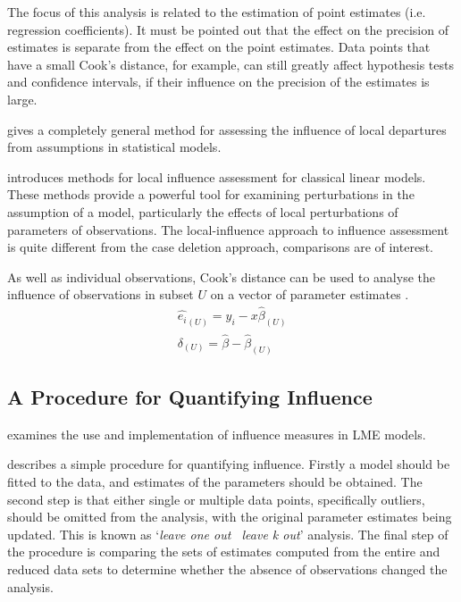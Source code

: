 \documentclass[12pt, a4paper]{report}
\theoremstyle{plain}
\theoremstyle{definition}
\theoremstyle{remark}
\begin{document}
The focus of this analysis is related to the estimation of point estimates (i.e. regression coefficients). It must be pointed out that the effect on the precision of estimates is separate from the effect on the point estimates. Data points that have a small Cook's distance, for example, can still greatly affect hypothesis tests and confidence intervals, if their  influence on the precision of the estimates is large.	
	
\citet{cook86} gives a completely general method for assessing the influence of local departures from assumptions in statistical models.

 \citet{cook86} introduces methods for local influence assessment for classical linear models. These methods provide a powerful tool for examining perturbations in the assumption of a model, particularly the effects of local perturbations of parameters of observations. The local-influence approach to influence assessment is quite different from the case deletion approach, comparisons are of interest.



	
	
	

	
	As well as individual observations, Cook's distance can be used to analyse the influence of observations in subset $U$ on a vector of parameter estimates \citep{cook77}.
	\begin{eqnarray}
	\hat{e_{i}}_{(U)} = y_{i} - x\hat{\beta}_{(U)}\\
	\delta_{(U)} = \hat{\beta} - \hat{\beta}_{(U)}
	\end{eqnarray}
	

	\subsection{A Procedure for Quantifying Influence}  %
	\citet{schabenberger} examines the use and implementation of influence measures in LME models.
	
	\citet{schabenberger} describes a simple procedure for quantifying influence. Firstly a model should be fitted to the data, and
	estimates of the parameters should be obtained. The second step is that either single or multiple data points, specifically outliers,
	should be omitted from the analysis, with the original parameter estimates being updated. This is known as `\textit{leave one out \ leave k out}' analysis. The final step of the procedure is comparing the sets of estimates computed from the entire and reduced data sets to determine whether the absence of observations changed the
	analysis.
	
\end{document}
